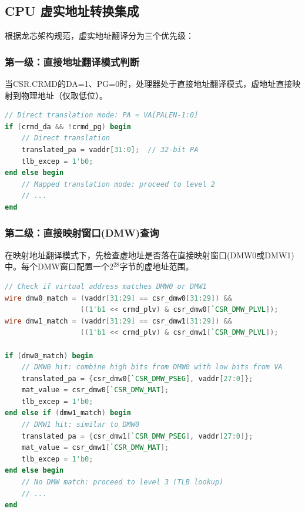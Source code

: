 \subsection{CPU 虚实地址转换集成}

根据龙芯架构规范，虚实地址翻译分为三个优先级：

\subsubsection{第一级：直接地址翻译模式判断}

当CSR.CRMD的DA=1、PG=0时，处理器处于直接地址翻译模式，虚地址直接映射到物理地址（仅取低位）。

\begin{lstlisting}[language=Verilog, caption=直接地址翻译逻辑]
// Direct translation mode: PA = VA[PALEN-1:0]
if (crmd_da && !crmd_pg) begin
    // Direct translation
    translated_pa = vaddr[31:0];  // 32-bit PA
    tlb_excep = 1'b0;
end else begin
    // Mapped translation mode: proceed to level 2
    // ...
end
\end{lstlisting}

\subsubsection{第二级：直接映射窗口(DMW)查询}

在映射地址翻译模式下，先检查虚地址是否落在直接映射窗口(DMW0或DMW1)中。每个DMW窗口配置一个2$^{28}$字节的虚地址范围。

\begin{lstlisting}[language=Verilog, caption=DMW地址翻译逻辑]
// Check if virtual address matches DMW0 or DMW1
wire dmw0_match = (vaddr[31:29] == csr_dmw0[31:29]) &&
                  ((1'b1 << crmd_plv) & csr_dmw0[`CSR_DMW_PLVL]);
wire dmw1_match = (vaddr[31:29] == csr_dmw1[31:29]) &&
                  ((1'b1 << crmd_plv) & csr_dmw1[`CSR_DMW_PLVL]);

if (dmw0_match) begin
    // DMW0 hit: combine high bits from DMW0 with low bits from VA
    translated_pa = {csr_dmw0[`CSR_DMW_PSEG], vaddr[27:0]};
    mat_value = csr_dmw0[`CSR_DMW_MAT];
    tlb_excep = 1'b0;
end else if (dmw1_match) begin
    // DMW1 hit: similar to DMW0
    translated_pa = {csr_dmw1[`CSR_DMW_PSEG], vaddr[27:0]};
    mat_value = csr_dmw1[`CSR_DMW_MAT];
    tlb_excep = 1'b0;
end else begin
    // No DMW match: proceed to level 3 (TLB lookup)
    // ...
end
\end{lstlisting}


